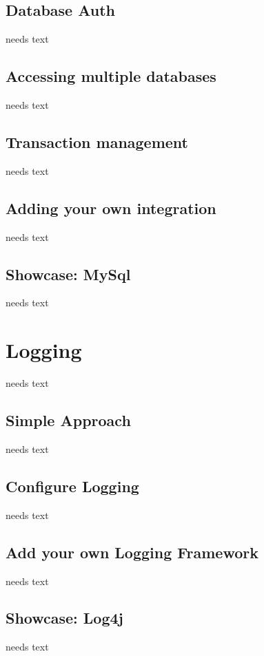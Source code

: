 \documentclass[a4paper,10pt,twoside]{book}
\begin{document}
\subsection{Database Auth}
needs text

\subsection{Accessing multiple databases}
needs text

\subsection{Transaction management}
needs text

\subsection{Adding your own integration}
needs text

\subsection{Showcase: MySql}
needs text
  
\section{Logging}
needs text

\subsection{Simple Approach}
needs text
  
\subsection{Configure Logging}
needs text
  
\subsection{Add your own Logging Framework}
needs text
  
\subsection{Showcase: Log4j}
needs text
    
\end{document}
